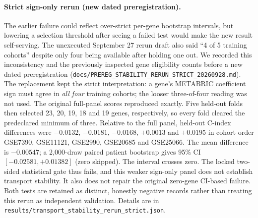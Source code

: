 \documentclass[12pt,a4paper]{article}
\begin{document}
\paragraph{Strict sign-only rerun (new dated preregistration).}
The earlier failure could reflect over-strict per-gene bootstrap intervals,
but lowering a selection threshold after seeing a failed test would make the
new result self-serving. The unexecuted September 27 rerun draft also said
``4 of 5 training cohorts'' despite only four being available after holding
one out. We recorded this inconsistency and the previously inspected gene
eligibility counts before a new dated preregistration
(\texttt{docs/PREREG\_STABILITY\_RERUN\_STRICT\_20260928.md}). The
replacement kept the strict interpretation: a gene's METABRIC coefficient
sign must agree in \emph{all four} training cohorts; the looser three-of-four
reading was not used. The original full-panel scores reproduced exactly.
Five held-out folds then selected 23, 20, 19, 18 and 19 genes, respectively,
so every fold cleared the predeclared minimum of three. Relative to the full
panel, held-out C-index differences were $-0.0132$, $-0.0181$, $-0.0168$,
$+0.0013$ and $+0.0195$ in cohort order GSE7390, GSE11121, GSE2990,
GSE20685 and GSE25066. The mean difference is $-0.00547$; a 2,000-draw
paired patient bootstrap gives 95\% CI $[-0.02581,+0.01382]$ (zero skipped).
The interval crosses zero. The locked two-sided statistical gate thus fails,
and this weaker sign-only panel does not establish transport stability. It
also does not repair the original zero-gene CI-based failure. Both tests are
retained as distinct, honestly negative records rather than treating this
rerun as independent validation. Details are in
\texttt{results/transport\_stability\_rerun\_strict.json}.
\end{document}
